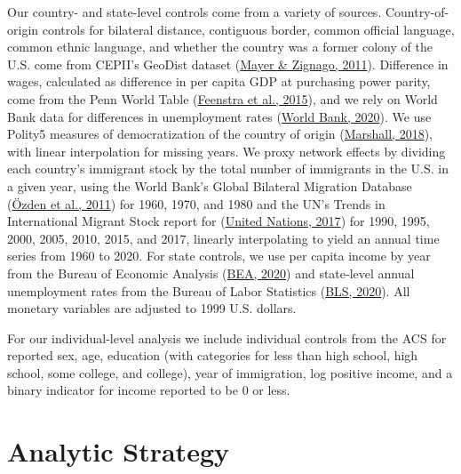 \documentclass[
  11pt,
]{article}
\begin{document}
Our country- and state-level controls come from a variety of sources. Country-of-origin controls for bilateral distance, contiguous border, common official language, common ethnic language, and whether the country was a former colony of the U.S. come from CEPII's GeoDist dataset (\protect\hyperlink{ref-mayer_2011}{Mayer \& Zignago, 2011}). Difference in wages, calculated as difference in per capita GDP at purchasing power parity, come from the Penn World Table (\protect\hyperlink{ref-feenstra_2015}{Feenstra et al., 2015}), and we rely on World Bank data for differences in unemployment rates (\protect\hyperlink{ref-worldbank_2020}{World Bank, 2020}). We use Polity5 measures of democratization of the country of origin (\protect\hyperlink{ref-marshall_2018}{Marshall, 2018}), with linear interpolation for missing years. We proxy network effects by dividing each country's immigrant stock by the total number of immigrants in the U.S. in a given year, using the World Bank's Global Bilateral Migration Database (\protect\hyperlink{ref-ozden_2011}{Özden et al., 2011}) for 1960, 1970, and 1980 and the UN's Trends in International Migrant Stock report for (\protect\hyperlink{ref-unitednations_2017}{United Nations, 2017}) for 1990, 1995, 2000, 2005, 2010, 2015, and 2017, linearly interpolating to yield an annual time series from 1960 to 2020. For state controls, we use per capita income by year from the Bureau of Economic Analysis (\protect\hyperlink{ref-bea_2020}{BEA, 2020}) and state-level annual unemployment rates from the Bureau of Labor Statistics (\protect\hyperlink{ref-bls_2020}{BLS, 2020}). All monetary variables are adjusted to 1999 U.S. dollars.

For our individual-level analysis we include individual controls from the ACS for reported sex, age, education (with categories for less than high school, high school, some college, and college), year of immigration, log positive income, and a binary indicator for income reported to be 0 or less.

\hypertarget{analytic-strategy}{%
\section{Analytic Strategy}\label{analytic-strategy}}
\end{document}
